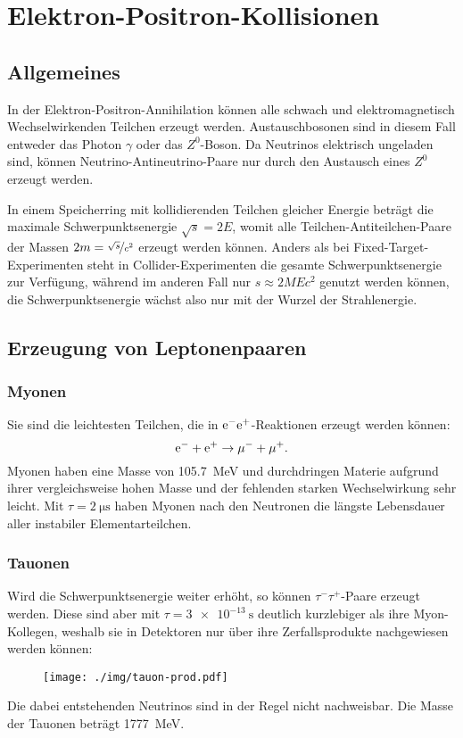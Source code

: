 \chapter{Elektron-Positron-Kollisionen}
\section{Allgemeines}
In der Elektron-Positron-Annihilation können alle schwach und elektromagnetisch Wechselwirkenden Teilchen erzeugt werden.
Austauschbosonen sind in diesem Fall entweder das Photon $\gamma$ oder das $Z^0$-Boson.
Da Neutrinos elektrisch ungeladen sind, können Neutrino-Antineutrino-Paare nur durch den Austausch eines $Z^0$ erzeugt werden.

In einem Speicherring mit kollidierenden Teilchen gleicher Energie beträgt die maximale Schwerpunktsenergie $\sqrt{s}=2E$, womit alle Teilchen-Antiteilchen-Paare der Massen $2m = \nicefrac{\sqrt{s}}{c^2}$ erzeugt werden können.
Anders als bei Fixed-Target-Experimenten steht in Collider-Experimenten die gesamte Schwerpunktsenergie zur Verfügung, während im anderen Fall nur $s\approx 2MEc^2$ genutzt werden können, die Schwerpunktsenergie wächst also nur mit der Wurzel der Strahlenergie.

\section{Erzeugung von Leptonenpaaren}
\subsection{Myonen}
Sie sind die leichtesten Teilchen, die in $\text{e}^-\text{e}^+$-Reaktionen erzeugt werden können:
\begin{equation*}
	\text{e}^- + \text{e}^+ \rightarrow \mu^- + \mu^+.
\end{equation*}
Myonen haben eine Masse von \SI{105.7}{\MeV} und durchdringen Materie aufgrund ihrer vergleichsweise hohen Masse und der fehlenden starken Wechselwirkung sehr leicht.
Mit $\tau=\SI{2}{\micro\second}$ haben Myonen nach den Neutronen die längste Lebensdauer aller instabiler Elementarteilchen.
\newpage
\subsection{Tauonen}
Wird die Schwerpunktsenergie weiter erhöht, so können $\tau^-\tau^+$-Paare erzeugt werden.
Diese sind aber mit $\tau=\SI{3e-13}{\second}$ deutlich kurzlebiger als ihre Myon-Kollegen, weshalb sie in Detektoren nur über ihre Zerfallsprodukte nachgewiesen werden können:
\begin{figure}[h!]
	\centering
	\texttt{[image: ./img/tauon-prod.pdf]}
\end{figure}
Die dabei entstehenden Neutrinos sind in der Regel nicht nachweisbar.
Die Masse der Tauonen beträgt \SI{1777}{\MeV}.

